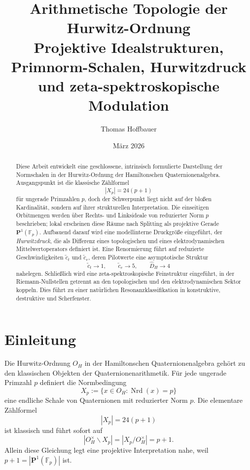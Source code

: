 \documentclass[a4paper,12pt]{article}
\title{\textbf{Arithmetische Topologie der Hurwitz-Ordnung}\\[0.4em]
	\large Projektive Idealstrukturen, Primnorm-Schalen, Hurwitzdruck\\
	und zeta-spektroskopische Modulation}
\author{Thomas Hoffbauer}
\date{März 2026}
\theoremstyle{definition}
\numberwithin{equation}{section}
\newcommand{\OH}{O_H}
\newcommand{\Fp}{\mathbb{F}_p}
\newcommand{\Nrd}{\operatorname{Nrd}}
\begin{document}
	\maketitle
	
	\begin{abstract}
		Diese Arbeit entwickelt eine geschlossene, intrinsisch formulierte Darstellung der Normschalen in der Hurwitz-Ordnung der Hamiltonschen Quaternionenalgebra. Ausgangspunkt ist die klassische Zählformel
		\[
		|X_p|=24(p+1)
		\]
		für ungerade Primzahlen \(p\), doch der Schwerpunkt liegt nicht auf der bloßen Kardinalität, sondern auf ihrer strukturellen Interpretation. Die einseitigen Orbitmengen werden über Rechts- und Linksideale von reduzierter Norm \(p\) beschrieben; lokal erscheinen diese Räume nach Splitting als projektive Gerade \(\mathbf P^1(\Fp)\). Aufbauend darauf wird eine modellinterne Druckgröße eingeführt, der \emph{Hurwitzdruck}, die als Differenz eines topologischen und eines elektrodynamischen Mittelwertoperators definiert ist. Eine Renormierung führt auf reduzierte Geschwindigkeiten \(\tilde c_t\) und \(\tilde c_e\), deren Pilotwerte eine asymptotische Struktur
		\[
		\tilde c_t\to 1,\qquad \tilde c_e\to 5,\qquad \widehat D_H\to 4
		\]
		nahelegen. Schließlich wird eine zeta-spektroskopische Feinstruktur eingeführt, in der Riemann-Nullstellen getrennt an den topologischen und den elektrodynamischen Sektor koppeln. Dies führt zu einer natürlichen Resonanzklassifikation in konstruktive, destruktive und Scherfenster.
	\end{abstract}
	
	\tableofcontents
	\newpage
	
	\section{Einleitung}
	
	Die Hurwitz-Ordnung \(\OH\) in der Hamiltonschen Quaternionenalgebra gehört zu den klassischen Objekten der Quaternionenarithmetik. Für jede ungerade Primzahl \(p\) definiert die Normbedingung
	\[
	X_p:=\{x\in \OH:\Nrd(x)=p\}
	\]
	eine endliche Schale von Quaternionen mit reduzierter Norm \(p\). Die elementare Zählformel
	\[
	|X_p|=24(p+1)
	\]
	ist klassisch und führt sofort auf
	\[
	|\OH^\times\backslash X_p|=|X_p/\OH^\times|=p+1.
	\]
	Allein diese Gleichung legt eine projektive Interpretation nahe, weil \(p+1=|\mathbf P^1(\Fp)|\) ist.
	
\end{document}

